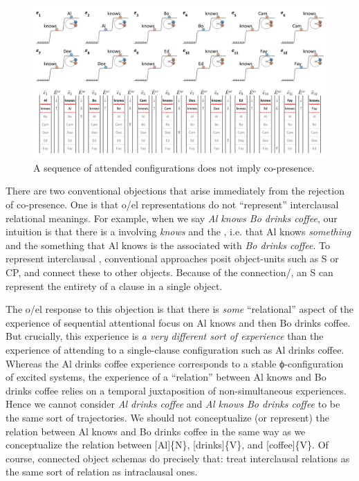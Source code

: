   
\begin{figure}
\includegraphics[width=\textwidth]{figures/Tilsen-img106.png}
\caption{A sequence of attended configurations does not imply co-presence.}
\label{fig:5:2}
\end{figure}
 

  There are two conventional objections that arise immediately from the rejection of co-presence. One is that o/el representations do not “represent” interclausal relational meanings. For example, when we say \textit{Al knows Bo drinks coffee}, our intuition is that there is a  involving \textit{knows} and the , i.e. that Al knows \textit{something} and the something that Al knows is the  associated with \textit{Bo drinks coffee}. To represent interclausal , conventional approaches posit object-units such as S or CP, and connect these to other objects. Because of the connection/, an S can represent the entirety of a clause in a single object. 

  The o/el response to this objection is that there is \textit{some} “relational” aspect of the experience of sequential attentional focus on {\textbar}Al knows{\textbar} and then {\textbar}Bo drinks coffee{\textbar}. But crucially, this experience is \textit{a very different sort of experience} than the experience of attending to a single-clause configuration such as {\textbar}Al drinks coffee{\textbar}. Whereas the {\textbar}Al drinks coffee{\textbar} experience corresponds to a stable ϕ-con\-fig\-u\-ra\-tion of excited systems, the experience of a “relation” between {\textbar}Al knows{\textbar} and {\textbar}Bo drinks coffee{\textbar} relies on a temporal juxtaposition of non-simultaneous experiences. Hence we cannot consider \textit{Al drinks coffee} and \textit{Al knows Bo drinks coffee} to be the same sort of trajectories. We should not conceptualize (or represent) the relation between {\textbar}Al knows{\textbar} and {\textbar}Bo drinks coffee{\textbar} in the same way as we conceptualize the relation between [Al]\{N\}, [drinks]\{V\}, and [coffee]\{V\}. Of course, connected object schemas do precisely that: treat interclausal relations as the same sort of relation as intraclausal ones.

